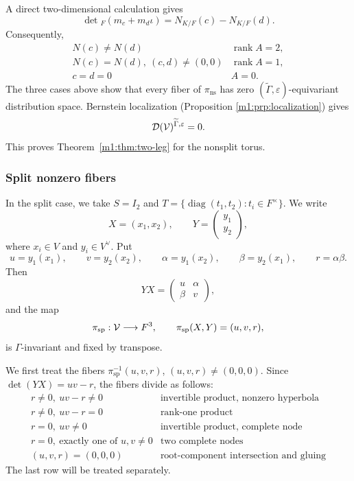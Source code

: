 A direct two-dimensional calculation gives
\[
    \det{_F}(m_c+m_d\iota)=N_{K/F}(c)-N_{K/F}(d).
\]
Consequently,
\[
\begin{array}{c|c}
N(c)\neq N(d) & \operatorname{rank}A=2,\\
N(c)=N(d),\ (c,d)\neq(0,0) & \operatorname{rank}A=1,\\
c=d=0 & A=0.
\end{array}
\]
The three cases above show that every fiber of
$\pi_{\mathrm{ns}}$ has zero $(\widetilde \Gamma,\varepsilon)$-equivariant distribution
space.  Bernstein localization (Proposition \ref{m1:prp:localization}) gives
\[
    \mathcal D(\mathcal V)^{\widetilde \Gamma,\varepsilon}=0.
\]
This proves Theorem~\ref{m1:thm:two-leg} for the nonsplit torus.

\subsubsection{Split nonzero fibers}\label{m1:subsec:two-leg-split-nonzero}

In the split case, we take $S=I_2$ and
\(T=\{\operatorname{diag}(t_1,t_2):t_i\in F^\times\}\). We write
\[
    X=(x_1,x_2),
    \qquad
    Y=\begin{pmatrix}y_1\\y_2\end{pmatrix},
\]
where $x_i\in V$ and $y_i\in V^\vee$.  Put
\[
    u=y_1(x_1),
    \qquad
    v=y_2(x_2),
    \qquad
    \alpha=y_1(x_2),
    \qquad
    \beta=y_2(x_1),
    \qquad
    r=\alpha\beta.
\]
Then
\[
    YX=
    \begin{pmatrix}
        u&\alpha\\
        \beta&v
    \end{pmatrix},
\]
and the map
\[
    \pi_{\mathrm{sp}}:\mathcal V\longrightarrow F^3,
    \qquad
    \pi_{\mathrm{sp}}(X,Y)=(u,v,r),
\]
is $\Gamma$-invariant and fixed by transpose.

We first treat the fibers \(\pi_{\mathrm{sp}}^{-1}(u,v,r)\), \((u,v,r)\neq(0,0,0)\). Since $\det(YX)=uv-r$, the fibers divide as follows:
\[
\begin{array}{c|c}
r\neq0,\ uv-r\neq0&\text{invertible product, nonzero hyperbola}\\
r\neq0,\ uv-r=0&\text{rank-one product}\\
r=0,\ uv\neq0&\text{invertible product, complete node}\\
r=0,\ \text{exactly one of }u,v\neq0&\text{two complete nodes}\\
(u,v,r)=(0,0,0)&\text{root-component intersection and gluing}
\end{array}
\]
The last row will be treated separately.

